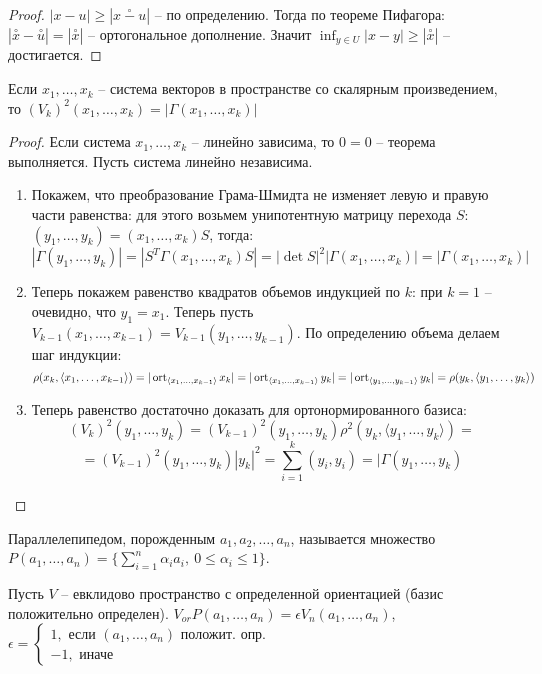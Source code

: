 \begin{proof}
    $|x - u| \geq |\stackrel{\circ}{x - u}|$ -- по определению. Тогда по теореме Пифагора: $|\stackrel{\circ}{x} - \stackrel{\circ}{u}| = |\stackrel{\circ}{x}|$ -- ортогональное дополнение. Значит $\inf_{y \in U} |x - y| \geq |\stackrel{\circ}{x}|$ -- достигается.
\end{proof}

\begin{theorem}
    Если $x_1, \dots, x_k$ -- система векторов в пространстве со скалярным произведением, то $(V_k)^2(x_1, \dots, x_k) = |\Gamma(x_1, \dots, x_k)|$
\end{theorem}

\begin{proof}
    Если система $x_1, \dots, x_k$ -- линейно зависима, то $0 = 0$ -- теорема выполняется. Пусть система линейно независима.
    \begin{enumerate}
        \item Покажем, что преобразование Грама-Шмидта не изменяет левую и правую части равенства: для этого возьмем унипотентную матрицу перехода $S$: $(y_1, \dots, y_k) = (x_1, \dots, x_k)S$, тогда:
        $$|\Gamma(y_1, \dots, y_k)| = |S^T \Gamma(x_1, \dots, x_k)S| = |\det S|^2 |\Gamma(x_1, \dots, x_k)| = |\Gamma (x_1, \dots, x_k)|$$
        \item Теперь покажем равенство квадратов объемов индукцией по $k$: при $k = 1$ -- очевидно, что $y_1 = x_1$. Теперь пусть $V_{k - 1} (x_1, \dots, x_{k - 1}) = V_{k - 1}(y_1, \dots, y_{k - 1})$. По определению объема делаем шаг индукции:
        $$\rho(x_k, \langle x_1, \dots, x_{k -1} \rangle) = |\operatorname{ort}_{\langle x_1, \dots, x_{k -1} \rangle} x_k| = |\operatorname{ort}_{\langle x_1, \dots, x_{k -1} \rangle} y_k| = |\operatorname{ort}_{\langle y_1, \dots, y_{k -1} \rangle} y_k| = \rho(y_k, \langle y_1, \dots, y_k \rangle)$$
        \item Теперь равенство достаточно доказать для ортонормированного базиса:
        \[(V_k)^2(y_1, \dots, y_k) = (V_{k - 1})^2(y_1, \dots, y_k) \rho^2(y_k, \langle y_1, \dots, y_k \rangle) = \]\[ = (V_{k - 1})^2(y_1, \dots, y_k) |y_k|^2 = \displaystyle\sum_{i = 1}^{k} (y_i, y_i) = |\Gamma (y_1, \dots, y_k)\]
    \end{enumerate}
\end{proof}

\begin{definition}
    Параллелепипедом, порожденным $a_1, a_2, \ldots, a_n$, называется множество $P(a_1, \ldots, a_n) = \{\sum_{i = 1}^{n}\alpha_i a_i , \ 0 \leq \alpha_i \leq 1\}$. 
\end{definition}

\begin{definition}
    Пусть $V$ -- евклидово пространство с определенной ориентацией (базис положительно определен). $V_{or}P(a_{1}, \ldots, a_{n}) = \epsilon V_{n}(a_{1}, \ldots, a_{n})$, $\epsilon = 
    \begin{cases}
        1,  \text{ если } (a_1, \ldots, a_n) \text{ положит. опр. } \\
        -1, \text{ иначе }
    \end{cases}$ 
\end{definition}